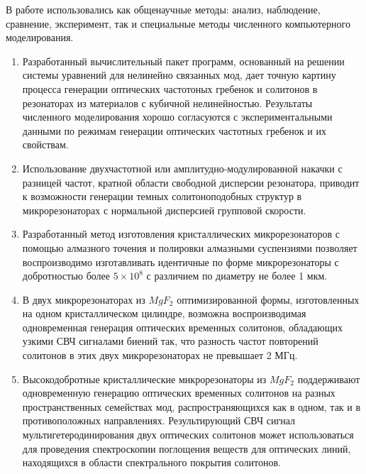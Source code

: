 {\methods} В работе использовались как общенаучные методы: анализ, наблюдение, сравнение, эксперимент, так и специальные методы численного компьютерного моделирования.

{}
\begin{enumerate}
  \item Разработанный вычислительный пакет программ, основанный на решении системы уравнений для нелинейно связанных мод, дает точную картину процесса генерации оптических частотоных гребенок и солитонов в резонаторах из материалов с кубичной нелинейностью. Результаты численного моделирования хорошо согласуются с экспериментальными данными по режимам генерации оптических частотных гребенок и их свойствам.
  \item Использование двухчастотной или амплитудно-модулированной накачки с разницей частот, кратной области свободной дисперсии резонатора, приводит к возможности генерации темных солитоноподобных структур в микрорезонаторах с нормальной дисперсией групповой скорости.
  \item Разработанный метод изготовления кристаллических микрорезонаторов с помощью алмазного точения и полировки алмазными суспензиями позволяет воспроизводимо изготавливать идентичные по форме микрорезонаторы с добротностью более $5\times10^8$ с различием по диаметру не более 1 мкм.
  \item В двух микрорезонаторах из $MgF_2$ оптимизированной формы, изготовленных на одном кристаллическом цилиндре, возможна воспроизводимая одновременная генерация оптических временных солитонов, обладающих узкими СВЧ сигналами биений так, что разность частот повторений солитонов в этих двух микрорезонаторах не превышает 2 МГц.
  \item Высокодобротные кристаллические микрорезонаторы из $MgF_2$ поддерживают одновременную генерацию оптических временных солитонов на разных пространственных семействах мод, распространяющихся как в одном, так и в противоположных направлениях. Результирующий СВЧ сигнал мультигетеродинирования двух оптических солитонов может использоваться для проведения спектроскопии поглощения веществ для оптических линий, находящихся в области спектрального покрытия солитонов.
\end{enumerate}

